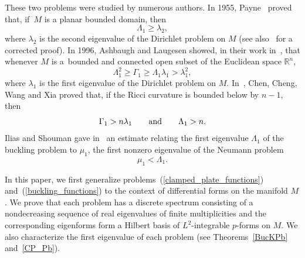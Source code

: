 \documentclass[10pt,a4paper]{amsart}
\newcommand{\R}{{\mathbb R}}
\numberwithin{equation}{section}
\theoremstyle{definition}
\begin{document}
These two problems were studied by numerous authors.
In 1955, Payne~\cite{Payne1955} proved that, if~$M$ is a planar bounded domain, then
\begin{equation*}
\Lambda_1 \ge \lambda_2,
\end{equation*}
where $\lambda_2$ is the second eigenvalue of the Dirichlet problem on $M$ (see also~\cite{Friedlander2004} for a corrected proof).
In 1996, Ashbaugh and Laugesen showed, in their work in~\cite{AL}, that whenever $M$ is a~bounded and connected open subset of the Euclidean space $\R^n$,
\begin{equation}
\label{AL} \Lambda_1^2 \ge \Gamma_1 \ge \Lambda_1 \lambda_1 > \lambda_1^2,
\end{equation}
where $\lambda_1$ is the first eigenvalue of the Dirichlet problem on $M$.
 In~\cite{ChenChengWangXia2012}, Chen, Cheng, Wang and Xia proved that, if the Ricci curvature is bounded below by $n-1$, then
\begin{equation*}%
\Gamma_1 > n\lambda_1\qquad\hbox{and}\qquad \Lambda_1>n.
\end{equation*}
Ilias and Shouman gave in~\cite{IliasShouman2019} an estimate relating the first eigenvalue $\Lambda_1$ of the buckling problem to $\mu_1$, the first nonzero eigenvalue of the Neumann problem
 \begin{equation} \label{IS}
 \mu_1 < \Lambda_1.
 \end{equation}

In this paper, we first generalize problems~(\ref{clamped_plate_functions}) and~(\ref{buckling_functions}) to the context of differential forms on the manifold $M$.
We prove that each problem has a discrete spectrum consisting of a nondecreasing sequence of real eigenvalues of finite multiplicities and the corresponding eigenforms form a Hilbert basis of $L^2$-integrable $p$-forms on $M$.
We also characterize the first eigenvalue of each problem (see Theorems~\ref{BucKPb} and~\ref{CP_Pb}).
\end{document}
